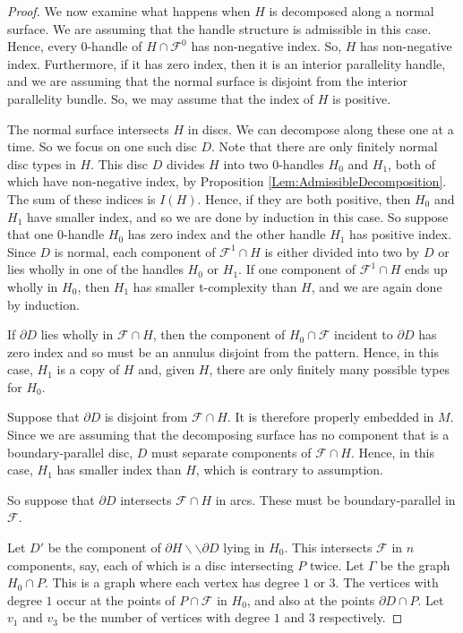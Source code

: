 \documentclass[oneside]{amsart}
\numberwithin{equation}{section}
\theoremstyle{plain}
\theoremstyle{definition}
\newcommand{\cut}{\backslash\backslash}
\begin{document}
\begin{proof}
We now examine what happens when $H$ is decomposed along a normal surface. We are assuming that the handle structure is admissible in this case. Hence, every 0-handle of $H \cap \mathcal{F}^0$ has non-negative index. So, $H$ has non-negative index. Furthermore, if it has zero index, then it is an interior parallelity handle, and we are assuming that the normal surface is disjoint from the interior parallelity bundle. So, we may assume that the index of $H$ is positive.


The normal surface intersects $H$ in discs. We can decompose along these one at a time. So we focus on one such disc $D$. Note that there are only finitely normal disc types in $H$. This disc $D$ divides $H$ into two 0-handles $H_0$ and $H_1$, both of which have non-negative index, by Proposition \ref{Lem:AdmissibleDecomposition}. The sum of these indices is $I(H)$. Hence, if they are both positive, then $H_0$ and $H_1$ have smaller index, and so we are done by induction in this case. So suppose that one 0-handle $H_0$ has zero index and the other handle $H_1$ has positive index. Since $D$ is normal, each component of $\mathcal{F}^1 \cap H$ is either divided into two by $D$ or lies wholly in one of the handles $H_0$ or $H_1$. If one component of $\mathcal{F}^1 \cap H$ ends up wholly in $H_0$, then $H_1$ has smaller t-complexity than $H$, and we are again done by induction.

If $\partial D$ lies wholly in $\mathcal{F} \cap H$, then the component of $H_0 \cap \mathcal{F}$ incident to $\partial D$ has zero index and so must be an annulus disjoint from the pattern. Hence, in this case, $H_1$ is a copy of $H$ and, given $H$, there are only finitely many possible types for $H_0$. 

Suppose that $\partial D$ is disjoint from $\mathcal{F} \cap H$. It is therefore properly embedded in $M$. Since we are assuming that the decomposing surface has no component that is a boundary-parallel disc, $D$ must separate components of $\mathcal{F} \cap H$. Hence, in this case, $H_1$ has smaller index than $H$, which is contrary to assumption. 

So suppose that $\partial D$ intersects $\mathcal{F} \cap H$ in arcs. These must be boundary-parallel in $\mathcal{F}$.

Let $D'$ be the component of $\partial H \cut \partial D$ lying in $H_0$. This intersects $\mathcal{F}$ in $n$ components, say, each of which is a disc intersecting $P$ twice.
Let $\Gamma$ be the graph $H_0 \cap P$. This is a graph where each vertex has degree $1$ or $3$. The vertices with degree $1$ occur at the points of $P \cap \mathcal{F}$ in $H_0$, and also at the points $\partial D \cap P$. Let $v_1$ and $v_3$ be the number of vertices with degree $1$ and $3$ respectively. 


\end{proof}
\end{document}
